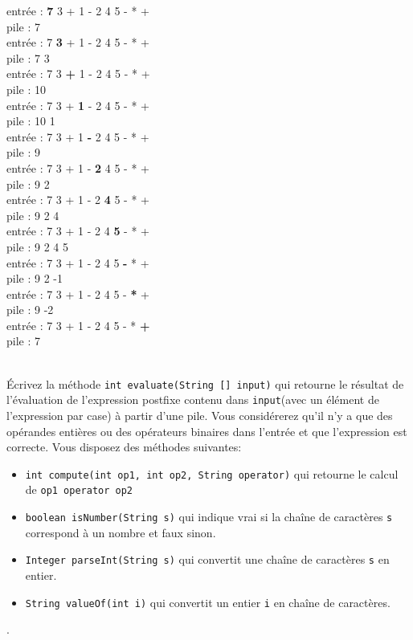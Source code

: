 \documentclass[iutinfo,a4paper,corrections,10pt]{ustl-tdtp}
\begin{document}
\begin{solution}
{\color{red}
entrée : \textbf{7} 3 + 1 - 2 4 5 - * +  \\
pile : 7 
\\
entrée : 7 \textbf{3} + 1 - 2 4 5 - * +  \\
pile : 7 3 
\\
entrée : 7 3 \textbf{+} 1 - 2 4 5 - * +  \\
pile : 10
\\
entrée : 7 3 + \textbf{1} - 2 4 5 - * +  \\
pile : 10 1
\\
entrée : 7 3 + 1 \textbf{-} 2 4 5 - * +  \\
pile : 9
\\
entrée : 7 3 + 1 - \textbf{2} 4 5 - * +  \\
pile : 9 2 
\\
entrée : 7 3 + 1 - 2 \textbf{4} 5 - * +  \\
pile : 9 2 4
\\
entrée : 7 3 + 1 - 2 4 \textbf{5} - * +  \\
pile : 9 2 4 5
\\
entrée : 7 3 + 1 - 2 4 5 \textbf{-} * +  \\
pile : 9 2 -1
\\
entrée : 7 3 + 1 - 2 4 5 - \textbf{*} +  \\
pile : 9 -2
\\
entrée : 7 3 + 1 - 2 4 5 - * \textbf{+}  \\
pile : 7
\\
}
\end{solution}

~\\ \question Écrivez la méthode \texttt{int evaluate(String [] input)} qui retourne le résultat de l'évaluation de l'expression postfixe contenu dans \texttt{input}(avec un élément de l'expression par case) à partir d'une pile. Vous considérerez qu'il n'y a que des opérandes entières ou des opérateurs binaires dans l'entrée et que l'expression est correcte. Vous disposez des méthodes suivantes:
\begin{itemize}
\item \texttt{int compute(int op1, int op2, String operator)} qui retourne le calcul de \texttt{op1 operator op2} 
\item \texttt{boolean isNumber(String s)} qui indique vrai si la chaîne de caractères \texttt{s} correspond à un nombre et faux sinon.
\item \texttt{Integer parseInt(String s)} qui convertit une chaîne de caractères \texttt{s} en entier.
\item \texttt{String valueOf(int i)} qui convertit un entier \texttt{i} en chaîne de caractères.
\end{itemize}.
\end{document}
